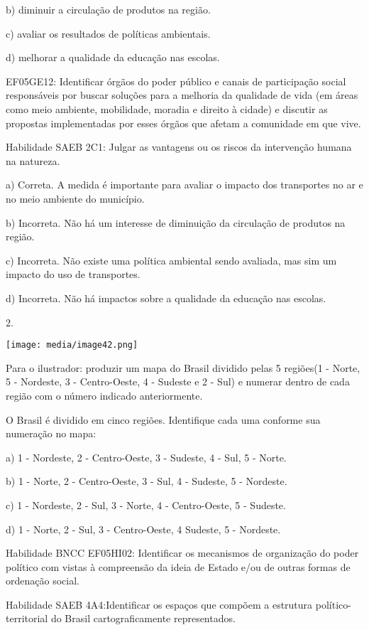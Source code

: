 b) diminuir a circulação de produtos na região.

c) avaliar os resultados de políticas ambientais.

d) melhorar a qualidade da educação nas escolas.

EF05GE12: Identificar órgãos do poder público e canais de participação
social responsáveis por buscar soluções para a melhoria da qualidade de
vida (em áreas como meio ambiente, mobilidade, moradia e direito à
cidade) e discutir as propostas implementadas por esses órgãos que
afetam a comunidade em que vive.

Habilidade SAEB 2C1: Julgar as vantagens ou os riscos da intervenção
humana na natureza.

a) Correta. A medida é importante para avaliar o impacto dos transportes
no ar e no meio ambiente do município.

b) Incorreta. Não há um interesse de diminuição da circulação de
produtos na região.

c) Incorreta. Não existe uma política ambiental sendo avaliada, mas sim
um impacto do uso de transportes.

d) Incorreta. Não há impactos sobre a qualidade da educação nas escolas.

2.

\texttt{[image: media/image42.png]}

Para o ilustrador: produzir um mapa do Brasil dividido pelas 5 regiões(1
- Norte, 5 - Nordeste, 3 - Centro-Oeste, 4 - Sudeste e 2 - Sul) e
numerar dentro de cada região com o número indicado anteriormente.

O Brasil é dividido em cinco regiões. Identifique cada uma conforme sua
numeração no mapa:

a) 1 - Nordeste, 2 - Centro-Oeste, 3 - Sudeste, 4 - Sul, 5 - Norte.

b) 1 - Norte, 2 - Centro-Oeste, 3 - Sul, 4 - Sudeste, 5 - Nordeste.

c) 1 - Nordeste, 2 - Sul, 3 - Norte, 4 - Centro-Oeste, 5 - Sudeste.

d) 1 - Norte, 2 - Sul, 3 - Centro-Oeste, 4 Sudeste, 5 - Nordeste.

Habilidade BNCC EF05HI02: Identificar os mecanismos de organização do
poder político com vistas à compreensão da ideia de Estado e/ou de
outras formas de ordenação social.

Habilidade SAEB 4A4:Identificar os espaços que compõem a estrutura
político-territorial do Brasil cartograficamente representados.

